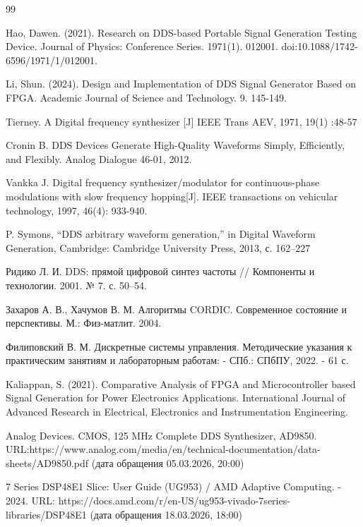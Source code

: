 \documentclass[12pt,a4paper,TimesNewRoman]{article}
\begin{document}
\clearpage
\newpage

\begin{thebibliography}{99}

    Hao, Dawen. (2021). Research on DDS-based Portable Signal Generation Testing Device. Journal of Physics: Conference Series. 1971(1). 012001. doi:10.1088/1742-6596/1971/1/012001.

    Li, Shun. (2024). Design and Implementation of DDS Signal Generator Based on FPGA. Academic Journal of Science and Technology. 9. 145-149.
    
    Tierney.  A  Digital  frequency  synthesizer  [J]  IEEE  Trans AEV, 1971, 19(1) :48-57 

    Cronin B. DDS Devices Generate High-Quality Waveforms Simply, Efficiently, and Flexibly. Analog Dialogue 46-01, 2012.

    Vankka  J.  Digital  frequency  synthesizer/modulator  for continuous-phase modulations with slow frequency hopping[J]. IEEE transactions on vehicular technology, 1997, 46(4): 933-940. 
    
    P. Symons, “DDS arbitrary waveform generation,” in Digital Waveform Generation, Cambridge: Cambridge University Press, 2013, с. 162–227

    Ридико Л. И. DDS: прямой цифровой синтез частоты // Компоненты и технологии. 2001. № 7. с. 50--54.

    Захаров А. В., Хачумов В. М. Алгоритмы CORDIC. Современное состояние и перспективы. М.: Физ-матлит. 2004.

    Филиповский В. М. Дискретные системы управления. Методические указания к практическим занятиям и лабораторным работам: - СПб.: СПбПУ, 2022. - 61 с.
    
    Kaliappan, S. (2021). Comparative Analysis of FPGA and Microcontroller based Signal Generation for Power Electronics Applications. International Journal of Advanced Research in Electrical, Electronics and Instrumentation Engineering.

    Analog Devices. CMOS, 125 MHz Complete DDS Synthesizer, AD9850. URL:https://www.analog.com/media/en/technical-documentation/data-sheets/AD9850.pdf (дата обращения 05.03.2026, 20:00)

    7 Series DSP48E1 Slice: User Guide (UG953) / AMD Adaptive Computing. - 2024. URL: https://docs.amd.com/r/en-US/ug953-vivado-7series-libraries/DSP48E1 (дата обращения 18.03.2026, 18:00)


\end{thebibliography}
\end{document}
